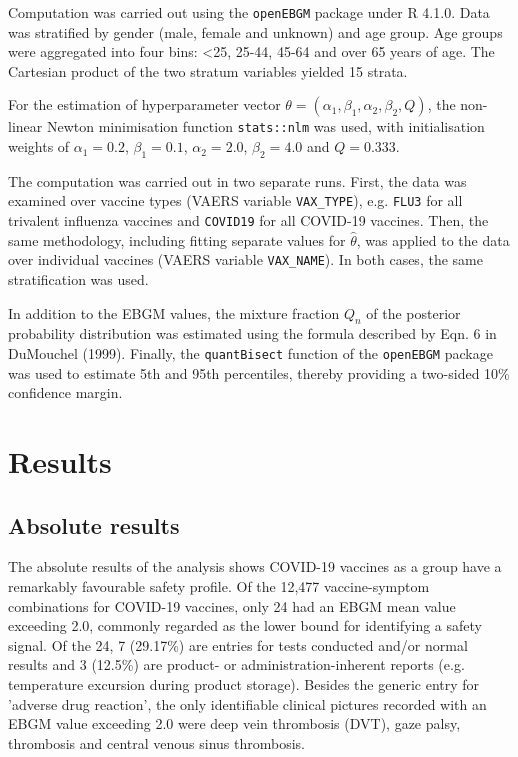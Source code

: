 \documentclass[12pt]{article}
\begin{document}
Computation was carried out using the \texttt{openEBGM}\cite{canida2017openebgm} package under R 4.1.0.\cite{rstats} Data was stratified by gender (male, female and unknown) and age group. Age groups were aggregated into four bins: <25, 25-44, 45-64 and over 65 years of age. The Cartesian product of the two stratum variables yielded 15 strata.

For the estimation of hyperparameter vector $\theta = (\alpha_1, \beta_1, \alpha_2, \beta_2, Q)$, the non-linear Newton minimisation function \texttt{stats::nlm} was used, with initialisation weights of $\alpha_1 = 0.2$, $\beta_1 = 0.1$, $\alpha_2 = 2.0$, $\beta_2 = 4.0$ and $Q = 0.333$. 

The computation was carried out in two separate runs. First, the data was examined over vaccine types (VAERS variable \texttt{VAX\_TYPE}), e.g. \texttt{FLU3} for all trivalent influenza vaccines and \texttt{COVID19} for all COVID-19 vaccines. Then, the same methodology, including fitting separate values for $\hat{\theta}$, was applied to the data over individual vaccines (VAERS variable \texttt{VAX\_NAME}). In both cases, the same stratification was used.

In addition to the EBGM values, the mixture fraction $Q_n$ of the posterior probability distribution was estimated using the formula described by Eqn. 6 in DuMouchel (1999).\cite{dumouchel1999bayesian} Finally, the \texttt{quantBisect} function of the \texttt{openEBGM} package was used to estimate 5th and 95th percentiles, thereby providing a two-sided 10\% confidence margin. 


\section{Results} %
\label{sec:results}

\subsection{Absolute results} %
\label{sub:absolute_results}

The absolute results of the analysis shows COVID-19 vaccines as a group have a remarkably favourable safety profile. Of the 12,477 vaccine-symptom combinations for COVID-19 vaccines, only 24 had an EBGM mean value exceeding 2.0, commonly regarded as the lower bound for identifying a safety signal. Of the 24, 7 (29.17\%) are entries for tests conducted and/or normal results and 3 (12.5\%) are product- or administration-inherent reports (e.g. temperature excursion during product storage). Besides the generic entry for 'adverse drug reaction', the only identifiable clinical pictures recorded with an EBGM value exceeding 2.0 were deep vein thrombosis (DVT), gaze palsy, thrombosis and central venous sinus thrombosis.
\end{document}
